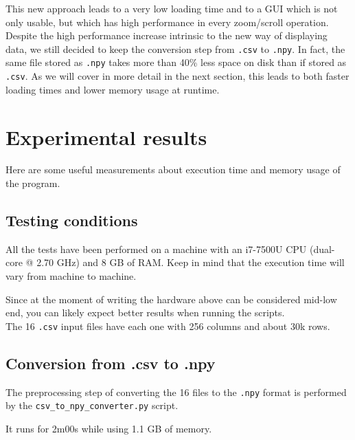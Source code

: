 \documentclass[11pt,a4paper]{article}
\begin{document}
This new approach leads to a very low loading time and to a GUI which is not only usable, but which has high performance in every zoom/scroll operation.\\

Despite the high performance increase intrinsic to the new way of displaying data, we still decided to keep the conversion step from \texttt{.csv} to \texttt{.npy}.
In fact, the same file stored as \texttt{.npy} takes more than 40\% less space on disk than if stored as \texttt{.csv}.
As we will cover in more detail in the next section, this leads to both faster loading times and lower memory usage at runtime.


\section{Experimental results}
\label{sec:experimental-results}

Here are some useful measurements about execution time and memory usage of the program.

\subsection{Testing conditions}

All the tests have been performed on a machine with an i7-7500U CPU (dual-core @ 2.70 GHz) and 8 GB of RAM.
Keep in mind that the execution time will vary from machine to machine.

Since at the moment of writing the hardware above can be considered mid-low end, you can likely expect better results when running the scripts.\\

The 16 \texttt{.csv} input files have each one with 256 columns and about 30k rows.

\subsection{Conversion from .csv to .npy}

The preprocessing step of converting the 16 files to the \texttt{.npy} format is performed by the \texttt{csv\_to\_npy\_converter.py} script.

It runs for 2m00s while using 1.1 GB of memory.
\end{document}
